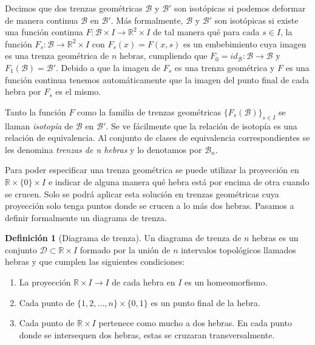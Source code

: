 \documentclass[12pt]{book}
\theoremstyle{definition}
\newtheorem{defi}{Definición}[section]
\begin{document}
Decimos que dos trenzas geométricas $\mathcal{B}$ y $\mathcal{B}'$ son isotópicas si podemos deformar de manera continua $\mathcal{B}$ en $\mathcal{B}'$. Más formalmente, $\mathcal{B}$ y $\mathcal{B}'$ son isotópicas si existe una función continua $F : \mathcal{B} \times I \rightarrow \mathbb{R}^2\times I$ de tal manera qué para cada $s\in I$, la función $F_s : \mathcal{B}\rightarrow \mathbb{R}^2\times I$ con $F_s(x)= F(x,s)$ es un embebimiento cuya imagen es una trenza geométrica de $n$ hebras, cumpliendo que $F_0 = id_{\mathcal{B}}: \mathcal{B}\rightarrow \mathcal{B}$ y $F_1(\mathcal{B}) = \mathcal{B}'$. Debido a que la imagen de $F_s$ es una trenza geométrica y $F$ es una función continua tenemos automáticamente que la imagen del punto final de cada hebra por $F_s$ es el mismo.

Tanto la función $F$ como la familia de trenzas geométricas $\{F_s(\mathcal{B})\}_{s\in I}$ se llaman \textit{isotopía} de $\mathcal{B}$ en $\mathcal{B}'$. Se ve fácilmente que la relación de isotopía es una relación de equivalencia. Al conjunto de clases de equivalencia correspondientes se les denomina \textit{trenzas de n hebras} y lo denotamos por $\mathcal{B}_n$.

Para poder especificar una trenza geométrica se puede utilizar la proyección en $\mathbb{R}\times\{0\}\times I$ e indicar de alguna manera qué hebra está por encima de otra cuando se crucen. Solo se podrá aplicar esta solución en trenzas geométricas cuya proyección solo tenga puntos donde se crucen a lo más dos hebras. Pasamos a definir formalmente un diagrama de trenza.


\begin{defi}[Diagrama de trenza]\label{diagrama_trenza}
Un diagrama de trenza de $n$ hebras es un conjunto $\mathcal{D}\subset\mathbb{R}\times I$ formado por la unión de $n$ intervalos topológicos llamados hebras y que cumplen las siguientes condiciones: 
\begin{enumerate}
\item La proyección $\mathbb{R}\times I\rightarrow I$ de cada hebra en $I$ es un homeomorfismo.
\item Cada punto de $\{1,2,...,n\}\times\{0,1\}$ es un punto final de la hebra.
\item Cada punto de $\mathbb{R}\times I$ pertenece como mucho a dos hebras. En cada punto donde se intersequen dos hebras, estas se cruzaran transversalmente.


\end{enumerate}
\end{defi}
\end{document}
